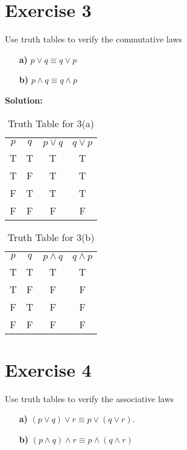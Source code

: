 \documentclass{Axon}
\begin{document}
\section*{Exercise 3}
Use truth tables to verify the commutative laws

\begin{enumerate}
    \item[\textbf{a)}] \(p \lor q \equiv q \lor p\)
    \item[\textbf{b)}] \(p \land q \equiv q \land p\)
\end{enumerate}

\noindent
\textbf{Solution:}

\begin{table}[ht]
    \centering
    \begin{tabular}{c|c|c|c}
        \(p\) & \(q\) & \(p \lor q\) & \(q \lor p\) \\
        T     & T     & T            & T            \\
        T     & F     & T            & T            \\
        F     & T     & T            & T            \\
        F     & F     & F            & F
    \end{tabular}
    \caption{Truth Table for 3(a)}
\end{table}

\begin{table}[ht]
    \centering
    \begin{tabular}{c|c|c|c}
        \(p\) & \(q\) & \(p \land q\) & \(q \land p\) \\
        T     & T     & T             & T             \\
        T     & F     & F             & F             \\
        F     & T     & F             & F             \\
        F     & F     & F             & F
    \end{tabular}
    \caption{Truth Table for 3(b)}
\end{table}

\section*{Exercise 4}
Use truth tables to verify the associative laws

\begin{enumerate}
    \item[\textbf{a)}] \((p \lor q) \lor r \equiv p \lor (q \lor r)\).
    \item[\textbf{b)}] \((p \land q) \land r \equiv p \land (q \land r)\)
\end{enumerate}
\end{document}
